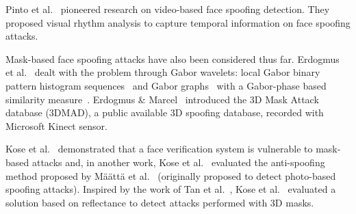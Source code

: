 
Pinto et al.~\cite{Pinto:SIBGRAPI:2012} pioneered research on video-based face spoofing detection. They proposed visual rhythm analysis to capture temporal information on face spoofing attacks.



Mask-based face spoofing attacks have also been considered thus far. Erdogmus et al.~\cite{Erdogmus:BIOSIG:2013} dealt with the problem through Gabor wavelets: local Gabor binary pattern histogram sequences~\cite{Zhang:ICCV:2005} and Gabor graphs~\cite{Wiskott:TPAMI:1997} with a Gabor-phase based similarity measure~\cite{Gunther:ICANN:2012}. Erdogmus \& Marcel~\cite{Erdogmus:BTAS:2013} introduced the 3D Mask Attack database (3DMAD), a public available 3D spoofing database, recorded with Microsoft Kinect sensor.


Kose et al.~\cite{Kose:ICASSP:2013} demonstrated that a face verification system is vulnerable to mask-based attacks and, in another work, Kose et al.~\cite{Kose:FG:2013} evaluated the anti-spoofing method proposed by M\"{a}\"{a}tt\"{a} et al.~\cite{Maatta:IJCB:2011} (originally proposed to detect photo-based spoofing attacks). 
Inspired by the work of Tan et al.~\cite{Tan:ECCV:2010}, Kose et al.~\cite{Kose:DSP:2013} evaluated a solution based on reflectance to detect attacks performed with 3D masks. 

